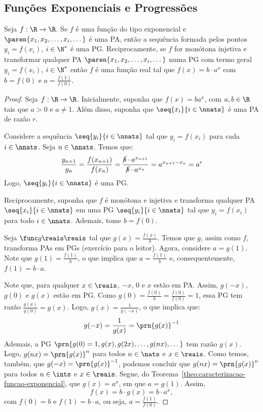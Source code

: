 \subsection{Funções Exponenciais e Progressões}

\begin{proposition}
Seja  $f: \R \to \R$. Se $f$ é uma função do tipo exponencial e
$\paren{x_1, x_2, \dots , x_i, \dots}$ é uma PA, então a sequência
formada pelos pontos $y_i = f(x_i)$, $i \in \N^*$ é uma PG.
Reciprocamente, se $f$ for monótona injetiva e transformar qualquer
PA $\paren{x_1, x_2, \dots , x_i, \dots}$ numa PG com termo geral
$y_i = f(x_i)$, $i \in \N^*$ então $f$ é uma função real tal
que $f(x) = b \cdot a^x$ com $b = f(0)$ e $a = \frac {f(1)} {f(0)}$.
\end{proposition}

\begin{proof}
    Seja $f: \R \to \R$. Inicialmente, suponha que $f(x) = b a^x$, com $a,b\in\R$ tais que $a>0$ e $a\ne 1$.
    Além disso, suponha que $\seq{x_i}{i \in \nnats}$ é uma PA de razão $r$.
    
    Considere a sequência $\seq{y_i}{i \in \nnats}$ tal que $y_i = f(x_i)$ para cada $i \in \nnats$.
    Seja $n \in \nnats$. Temos que:
    \[
        \frac{y_{n+1}}{y_n} = \frac{f(x_{n+1})}{f(x_n)} = \frac{\cancel b \cdot a^{x_{n+1}}}{\cancel b \cdot a^{x_n}} = 
        a^{x_{n+1}-x_n} = a^r
    \]
    Logo, $\seq{y_i}{i \in \nnats}$ é uma PG.

    Reciprocamente, suponha que $f$ é monótona e injetiva e transforma qualquer PA $\seq{x_i}{i \in \nnats}$
    em uma PG $\seq{y_i}{i \in \nnats}$ tal que $y_i = f(x_i)$ para todo $i \in \nnats$.
    Ademais, tome $b = f(0)$.

    Seja $\func g {\reais}{\reais}$ tal que $g(x) = \frac{f(x)}b$. 
    Temos que $g$, assim como $f$, transforma PAs em PGs (exercício para o leitor).
    Agora, considere $a = g(1)$. 
    Note que $g(1) = \frac{f(1)}b$, o que implica que $a = \frac{f(1)}b$ e, consequentemente,
    $f(1) = b\cdot a$. 
    
    Note que, para qualquer $x \in \reais$, $-x$, $0$ e $x$ estão em PA. 
    Assim, $g(-x)$, $g(0)$ e $g(x)$ estão em PG. 
    Como $g(0) = \frac{f(0)}{b} = \frac{f(0)}{f(0)} = 1$, essa PG tem razão
    $\frac{g(x)}{g(0)} = g(x)$.
    Logo, $g(x) = \frac{1}{g(-x)}$, o que implica que:
    \[
        g(-x) = \frac{1}{g(x)} = \prn{g(x)}^{-1}
    \]
    Ademais, a PG $\prn{g(0)=1, g(x), g(2x), \dots, g(nx), \dots}$ tem razão $g(x)$.
    Logo, $g(nx) = \prn{g(x)}^n$ para todos $n \in \nats$ e $x \in \reais$.
    Como temos, também, que $g(-x) = \prn{g(x)}^{-1}$, podemos concluir que
    $g(nx) = \prn{g(x)}^n$ para todos $n \in \ints$ e $x \in \reais$.
    Segue, do Teorema~\ref{theo:caracterizacao-funcao-exponencial}, que $g(x) = a^x$, 
    em que $a = g(1)$. Assim,
    \[
        f(x) = b\cdot g(x) = b \cdot a^x,
    \]
    com $f(0) = b$ e $f(1) = b\cdot a$, ou seja, $a = \frac{f(1)}{f(0)}$.


\end{proof}
